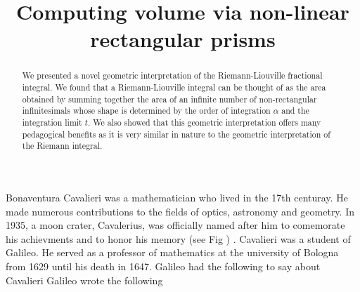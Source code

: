 \documentclass{article}
\theoremstyle{theorem}
\theoremstyle{definition}
\begin{document}
\title{Computing volume via non-linear rectangular prisms}

\maketitle



\noindent
Bonaventura Cavalieri was a mathematician who lived in the 17th centuray. He made numerous contributions to the fields of optics, astronomy and geometry. 
In 1935, a moon crater, Cavalerius, was officially named after him to comemorate his achievments and to honor his memory (see Fig ) \cite{?}.
Cavalieri was a student of Galileo. He served as a professor of mathematics at the university of Bologna from 1629 until his death in 1647. Galileo had the following 
to say about Cavalieri Galileo wrote the following  

\begin{abstract}
We presented a novel geometric interpretation of the Riemann-Liouville fractional integral. We found that a Riemann-Liouville integral can 
be thought of as the area obtained by summing together the area of an infinite number of non-rectangular infinitesimals whose shape is determined by the 
order of integration $\alpha$ and the integration limit $t$. We also showed that this geometric interpretation offers many pedagogical benefits as it is very similar
in nature to the geometric interpretation of the Riemann integral.   
\end{abstract}
\end{document}
